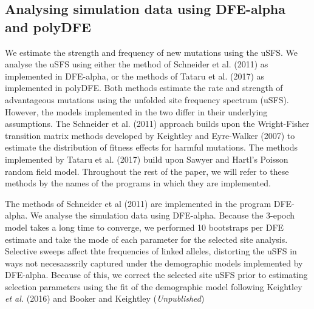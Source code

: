 \documentclass[11pt]{article}
\begin{document}
%
%

	\subsection*{Analysing simulation data using DFE-alpha and polyDFE}

	We estimate the strength and frequency of new mutations using the uSFS. We analyse the uSFS using either the method of Schneider et al. (2011) as implemented in DFE-alpha, or the methods of Tataru et al. (2017) as implemented in polyDFE. Both methods estimate the rate and strength of advantageous mutations using the unfolded site frequency spectrum (uSFS). However, the models implemented in the two differ in their underlying assumptions. The Schneider et al. (2011) approach builds upon the Wright-Fisher transition matrix methods developed by Keightley and Eyre-Walker (2007) to estimate the distribution of fitness effects for harmful mutations. The methods implemented by Tataru et al. (2017) build upon Sawyer and Hartl’s Poisson random field model.
Throughout the rest of the paper, we will refer to these methods by the names of the programs in which they are implemented.




		The methods of Schneider et al (2011) are implemented in the program DFE-alpha. We analyse the simulation data using DFE-alpha. Because the 3-epoch model takes a long time to converge, we performed 10 bootstraps per DFE estimate and take the mode of each parameter for the selected site analysis. Selective sweeps affect thte frequencies of linked alleles, distorting the uSFS in ways not necesaassrily captured under the demographic models implemented by DFE-alpha. Because of this, we correct the selected site uSFS prior to estimating selection parameters using the fit of the demographic model following Keightley \textit{et al.} (2016) and Booker and Keightley (\textit{Unpublished})
			
\end{document}
